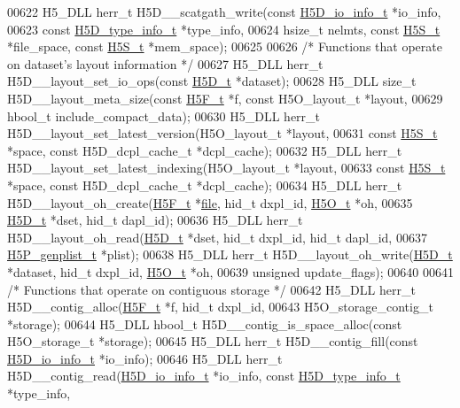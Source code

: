 \begin{DoxyCode}
00622 H5\_DLL herr\_t H5D\_\_scatgath\_write(\textcolor{keyword}{const} \hyperlink{struct_h5_d__io__info__t}{H5D\_io\_info\_t} *io\_info,
00623     \textcolor{keyword}{const} \hyperlink{struct_h5_d__type__info__t}{H5D\_type\_info\_t} *type\_info,
00624     hsize\_t nelmts, \textcolor{keyword}{const} \hyperlink{struct_h5_s__t}{H5S\_t} *file\_space, \textcolor{keyword}{const} \hyperlink{struct_h5_s__t}{H5S\_t} *mem\_space);
00625 
00626 \textcolor{comment}{/* Functions that operate on dataset's layout information */}
00627 H5\_DLL herr\_t H5D\_\_layout\_set\_io\_ops(\textcolor{keyword}{const} \hyperlink{struct_h5_d__t}{H5D\_t} *dataset);
00628 H5\_DLL \textcolor{keywordtype}{size\_t} H5D\_\_layout\_meta\_size(\textcolor{keyword}{const} \hyperlink{struct_h5_f__t}{H5F\_t} *f, \textcolor{keyword}{const} H5O\_layout\_t *layout,
00629     hbool\_t include\_compact\_data);
00630 H5\_DLL herr\_t H5D\_\_layout\_set\_latest\_version(H5O\_layout\_t *layout,
00631     \textcolor{keyword}{const} \hyperlink{struct_h5_s__t}{H5S\_t} *space, \textcolor{keyword}{const} H5D\_dcpl\_cache\_t *dcpl\_cache);
00632 H5\_DLL herr\_t H5D\_\_layout\_set\_latest\_indexing(H5O\_layout\_t *layout,
00633     \textcolor{keyword}{const} \hyperlink{struct_h5_s__t}{H5S\_t} *space, \textcolor{keyword}{const} H5D\_dcpl\_cache\_t *dcpl\_cache);
00634 H5\_DLL herr\_t H5D\_\_layout\_oh\_create(\hyperlink{struct_h5_f__t}{H5F\_t} *\hyperlink{structfile}{file}, hid\_t dxpl\_id, \hyperlink{struct_h5_o__t}{H5O\_t} *oh,
00635     \hyperlink{struct_h5_d__t}{H5D\_t} *dset, hid\_t dapl\_id);
00636 H5\_DLL herr\_t H5D\_\_layout\_oh\_read(\hyperlink{struct_h5_d__t}{H5D\_t} *dset, hid\_t dxpl\_id, hid\_t dapl\_id,
00637     \hyperlink{struct_h5_p__genplist__t}{H5P\_genplist\_t} *plist);
00638 H5\_DLL herr\_t H5D\_\_layout\_oh\_write(\hyperlink{struct_h5_d__t}{H5D\_t} *dataset, hid\_t dxpl\_id, \hyperlink{struct_h5_o__t}{H5O\_t} *oh,
00639     \textcolor{keywordtype}{unsigned} update\_flags);
00640 
00641 \textcolor{comment}{/* Functions that operate on contiguous storage */}
00642 H5\_DLL herr\_t H5D\_\_contig\_alloc(\hyperlink{struct_h5_f__t}{H5F\_t} *f, hid\_t dxpl\_id,
00643     H5O\_storage\_contig\_t *storage);
00644 H5\_DLL hbool\_t H5D\_\_contig\_is\_space\_alloc(\textcolor{keyword}{const} H5O\_storage\_t *storage);
00645 H5\_DLL herr\_t H5D\_\_contig\_fill(\textcolor{keyword}{const} \hyperlink{struct_h5_d__io__info__t}{H5D\_io\_info\_t} *io\_info);
00646 H5\_DLL herr\_t H5D\_\_contig\_read(\hyperlink{struct_h5_d__io__info__t}{H5D\_io\_info\_t} *io\_info, \textcolor{keyword}{const} 
      \hyperlink{struct_h5_d__type__info__t}{H5D\_type\_info\_t} *type\_info,

\end{DoxyCode}
